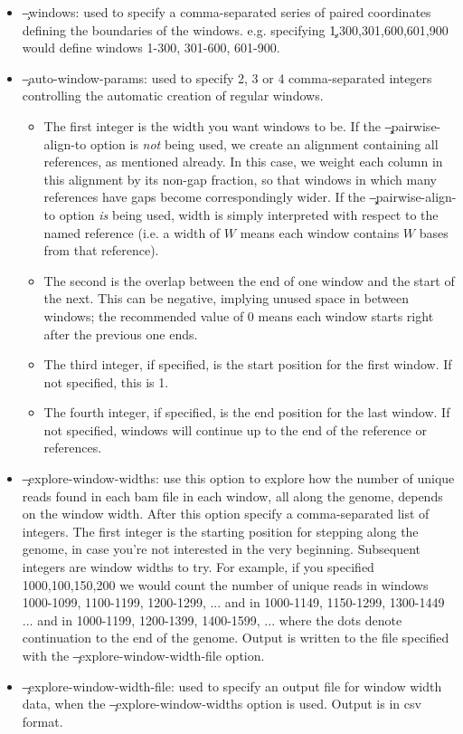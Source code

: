 \begin{itemize}
\item \c{--windows}: used to specify a comma-separated series of paired coordinates defining the boundaries of the windows.
e.g. specifying \c{1,300,301,600,601,900} would define windows 1-300, 301-600, 601-900.
\item \c{--auto-window-params}: used to specify 2, 3 or 4 comma-separated integers controlling the automatic creation of regular windows.
\begin{itemize}
\item The first integer is the width you want windows to be.
If the \c{--pairwise-align-to} option is {\it not} being used, we create an alignment containing all references, as mentioned already.
In this case, we weight each column in this alignment by its non-gap fraction, so that windows in which many references have gaps become correspondingly wider.
If the \c{--pairwise-align-to} option {\it is} being used, width is simply interpreted with respect to the named reference (i.e. a width of $W$ means each window contains $W$ bases from that reference).
\item The second is the overlap between the end of one window and the start of the next.
This can be negative, implying unused space in between windows; the recommended value of 0 means each window starts right after the previous one ends.
\item The third integer, if specified, is the start position for the first window.
If not specified, this is 1.
\item The fourth integer, if specified, is the end position for the last window.
If not specified, windows will continue up to the end of the reference or references.
\end{itemize}
\item \c{--explore-window-widths}: use this option to explore how the number of unique reads found in each bam file in each window, all along the genome, depends on the window width.
After this option specify a comma-separated list of integers.
The first integer is the starting position for stepping along the genome, in case you're not interested in the very beginning.
Subsequent integers are window widths to try.
For example, if you specified 1000,100,150,200 we would count the number of unique reads in windows 1000-1099, 1100-1199, 1200-1299, ... and in 1000-1149, 1150-1299, 1300-1449 ... and in 1000-1199, 1200-1399, 1400-1599, ... where the dots denote continuation to the end of the genome.
Output is written to the file specified with the \c{--explore-window-width-file} option.
\item \c{--explore-window-width-file}: used to specify an output file for window width data, when the \c{--explore-window-widths} option is used.
Output is in csv format.
\end{itemize}

